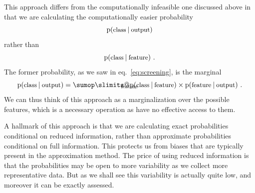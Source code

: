 \documentclass[\ifafour a4paper,12pt,\else a5paper,10pt,\fi%
onecolumn,oneside,article,%
british%
]{memoir}
\makeatletter
\theoremstyle{remark}
\theoremstyle{innote}
\def\sum{\DOTSI\sumop\slimits@}
\newcommand*{\p}{\mathrm{p}}%
\renewcommand*{\|}[1][]{\nonscript\:#1\vert\nonscript\:\mathopen{}}
\newcommand*{\eqn}{eq.}%
\makeatother
\begin{document}

This approach differs from the computationally infeasible one discussed above in that we are calculating the computationally easier probability
\begin{equation}
  \label{eq:approach_p_test}
  \p(\text{\small class} \| \text{\small output})
\end{equation}
rather than
\begin{equation}
  \label{eq:approach_p_feature}
  \p(\text{\small class} \| \text{\small feature}) \ .
\end{equation}
The former probability, as we saw in \eqn~\eqref{eq:screening}, is the marginal
\begin{equation}
  \label{eq:approach_p_marginal}
  \p(\text{\small class} \| \text{\small output}) =
  \sum_{\text{\clap{feature}}}
  \p(\text{\small class} \| \text{\small feature})\times
  \p(\text{\small feature} \| \text{\small output}) \ .
\end{equation}
We can thus think of this approach as a marginalization over the possible features, which is a necessary operation as have no effective access to them.

A hallmark of this approach is that we are calculating exact probabilities conditional on reduced information, rather than approximate probabilities conditional on full information. This protects us from biases that are typically present in the approximation method. The price of using reduced information is that the probabilities may be open to more variability as we collect more representative data. But as we shall see this variability is actually quite low, and moreover it can be exactly assessed.
\end{document}
